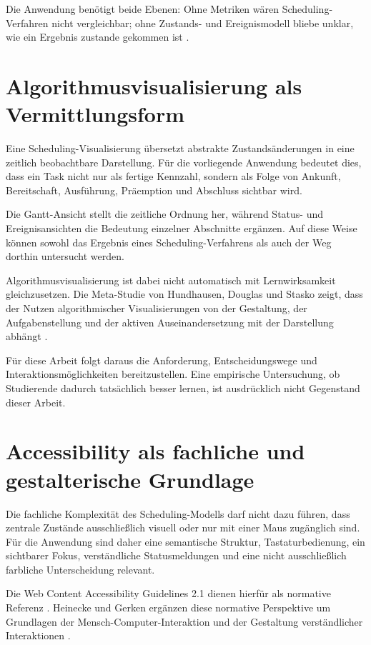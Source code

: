 Die Anwendung benötigt beide Ebenen: Ohne Metriken wären Scheduling-Verfahren nicht vergleichbar; ohne Zustands- und Ereignismodell bliebe unklar, wie ein Ergebnis zustande gekommen ist \cite{stallings_betriebssysteme,tanenbaum_moderne_betriebssysteme_de}.

\section{Algorithmusvisualisierung als Vermittlungsform}

Eine Scheduling-Visualisierung übersetzt abstrakte Zustandsänderungen in eine zeitlich beobachtbare Darstellung. Für die vorliegende Anwendung bedeutet dies, dass ein Task nicht nur als fertige Kennzahl, sondern als Folge von Ankunft, Bereitschaft, Ausführung, Präemption und Abschluss sichtbar wird.

Die Gantt-Ansicht stellt die zeitliche Ordnung her, während Status- und Ereignisansichten die Bedeutung einzelner Abschnitte ergänzen. Auf diese Weise können sowohl das Ergebnis eines Scheduling-Verfahrens als auch der Weg dorthin untersucht werden.

Algorithmusvisualisierung ist dabei nicht automatisch mit Lernwirksamkeit gleichzusetzen. Die Meta-Studie von Hundhausen, Douglas und Stasko zeigt, dass der Nutzen algorithmischer Visualisierungen von der Gestaltung, der Aufgabenstellung und der aktiven Auseinandersetzung mit der Darstellung abhängt \cite{hundhausen2002meta}.

Für diese Arbeit folgt daraus die Anforderung, Entscheidungswege und Interaktionsmöglichkeiten bereitzustellen. Eine empirische Untersuchung, ob Studierende dadurch tatsächlich besser lernen, ist ausdrücklich nicht Gegenstand dieser Arbeit.

\section{Accessibility als fachliche und gestalterische Grundlage}

Die fachliche Komplexität des Scheduling-Modells darf nicht dazu führen, dass zentrale Zustände ausschließlich visuell oder nur mit einer Maus zugänglich sind. Für die Anwendung sind daher eine semantische Struktur, Tastaturbedienung, ein sichtbarer Fokus, verständliche Statusmeldungen und eine nicht ausschließlich farbliche Unterscheidung relevant.

Die Web Content Accessibility Guidelines 2.1 dienen hierfür als normative Referenz \cite{wcag2018}. Heinecke und Gerken ergänzen diese normative Perspektive um Grundlagen der Mensch-Computer-Interaktion und der Gestaltung verständlicher Interaktionen \cite{heinecke_gerken_mci3}.

